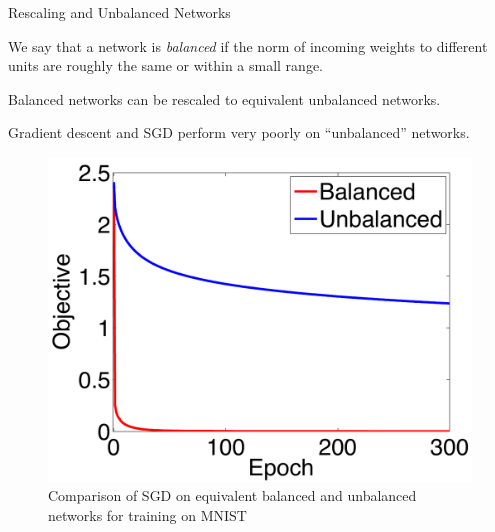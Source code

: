 \documentclass[presentation,xcolor={usenames,dvipsnames},10pt]{beamer}
\begin{document}
\begin{frame}{Rescaling and Unbalanced Networks}
\begin{definition}
We say that a network is {\em balanced} if the norm of
incoming weights to different units are roughly the same or within a
small range. 
\end{definition}

Balanced networks can be rescaled to equivalent unbalanced networks. 

Gradient descent and SGD perform very poorly on ``unbalanced''
networks.  

\begin{figure}
	\includegraphics[scale=0.2]{mnist-compare.pdf}
	\caption{Comparison of SGD on equivalent balanced and unbalanced networks for training on MNIST}
\end{figure}

\end{frame}
\end{document}
